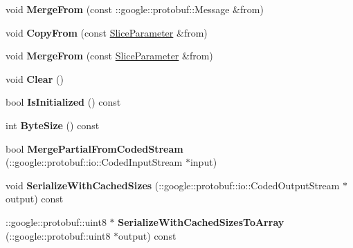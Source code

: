 \begin{DoxyCompactItemize}
void {\bfseries Merge\+From} (const \+::google\+::protobuf\+::\+Message \&from)
\item 
\mbox{\label{classcaffe_1_1_slice_parameter_aa5cb13b54e7e79d680a71b0b82cff139}} 
void {\bfseries Copy\+From} (const \mbox{\hyperlink{classcaffe_1_1_slice_parameter}{Slice\+Parameter}} \&from)
\item 
\mbox{\label{classcaffe_1_1_slice_parameter_a325d7d5633eec5fc8461b2e8aa075247}} 
void {\bfseries Merge\+From} (const \mbox{\hyperlink{classcaffe_1_1_slice_parameter}{Slice\+Parameter}} \&from)
\item 
\mbox{\label{classcaffe_1_1_slice_parameter_aec083f23853a1a40d271469f92507f29}} 
void {\bfseries Clear} ()
\item 
\mbox{\label{classcaffe_1_1_slice_parameter_abe501cc4c21704c7830ae2dd30db56e6}} 
bool {\bfseries Is\+Initialized} () const
\item 
\mbox{\label{classcaffe_1_1_slice_parameter_aca17fc6812aa8a3f6efc99c17367396d}} 
int {\bfseries Byte\+Size} () const
\item 
\mbox{\label{classcaffe_1_1_slice_parameter_a22d1e8cb7037f4ee1db2bcf281b47ffc}} 
bool {\bfseries Merge\+Partial\+From\+Coded\+Stream} (\+::google\+::protobuf\+::io\+::\+Coded\+Input\+Stream $\ast$input)
\item 
\mbox{\label{classcaffe_1_1_slice_parameter_a2721d8a8797c38227c3ef16e66670bea}} 
void {\bfseries Serialize\+With\+Cached\+Sizes} (\+::google\+::protobuf\+::io\+::\+Coded\+Output\+Stream $\ast$output) const
\item 
\mbox{\label{classcaffe_1_1_slice_parameter_a0cb24e739aa641656539a0e857f6b824}} 
\+::google\+::protobuf\+::uint8 $\ast$ {\bfseries Serialize\+With\+Cached\+Sizes\+To\+Array} (\+::google\+::protobuf\+::uint8 $\ast$output) const
\item 
\mbox{\label{classcaffe_1_1_slice_parameter_a04eab2133c81ae79226931d7fab849ee}} 

\end{DoxyCompactItemize}
